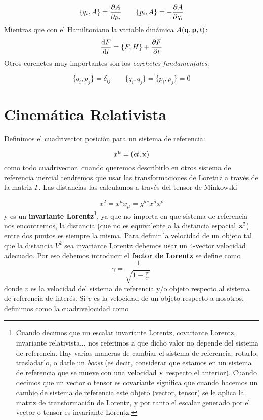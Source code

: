 \begin{equation}
	\{q_i,A\} = \frac{\partial A}{\partial p_i} \qquad 
	\{p_i,A\} = - \frac{\partial A}{\partial q_i}
\end{equation}
Mientras que con el Hamiltoniano la variable dinámica $A(\mathbf{q},\mathbf{p},t)$:
\begin{equation}
	 \frac{\mathrm{d} F}{\mathrm{d} t} = \{ F,H\} + \frac{\partial F}{\partial t}
\end{equation}
Otros corchetes muy importantes son los \textit{corchetes fundamentales}:

\begin{equation}
	\{q_i,p_j\} = \delta_{ij}  \qquad \{q_i,q_j\}=\{p_i,p_j\}=0
\end{equation}



\section{Cinemática Relativista}

Definimos el cuadrivector posición para un sistema de referencia:

\begin{equation}
	x^\mu = (ct,\mathbf{x})
\end{equation}
como todo cuadrivector, cuando queremos describirlo en otros sistema de referencia inercial tendremos que usar las transformaciones de Loretnz a través de la matriz $\Gamma$. Las distancias las calculamos a través del tensor de Minkowski 

\begin{equation}
	x^2 = x^\mu x_\mu = g^{\mu \nu} x^{\mu} x^{\nu}
\end{equation}
y es un \textbf{invariante Lorentz}\footnote{Cuando decimos que un escalar invariante Lorentz, covariante Lorentz, invariante relativista... nos referimos a que dicho valor no depende del sistema de referencia. Hay varias maneras de cambiar el sistema de referencia: rotarlo, trasladarlo, o darle un \textit{boost} (es decir, considerar que estamos en un sistema de referencia que se mueve con una velocidad $\mathbf{v}$ respecto el anterior). Cuando decimos que un vector o tensor es covariante significa que cuando hacemos un cambio de sistema de referencia este objeto (vector, tensor) se le aplica la matriz de transformación de Lorentz, y por tanto el escalar generado por el vector o tensor es invariante Lorentz.}, ya que no importa en que sistema de referencia nos encontremos, la distancia (que no es equivalente a la distancia espacial $\mathbf{x}^2$) entre dos puntos es siempre la misma. Para definir la velocidad de un objeto tal que la distancia $V^2$ sea invariante Lorentz debemos usar un 4-vector velocidad adecuado. Por eso debemos introducir el \textbf{factor de Lorentz} se define como
\begin{equation}
	\gamma= \frac{1}{\sqrt{1-\frac{v^2}{c^2}}}
\end{equation}
donde $v$ es la velocidad del sistema de referencia y/o objeto respecto al sistema de referencia de interés. Si $v$ es la velocidad de un objeto respecto a nosotros, definimos como la cuadrivelocidad como

